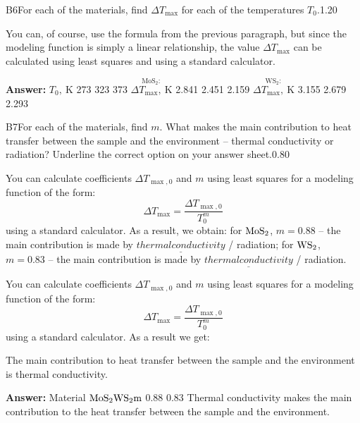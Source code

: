 \documentclass[11pt,a4paper]{article}
\begin{document}
\begin{solcard}{B6}{For each of the materials, find $\Delta T_{\max}$ for each of the temperatures $T_0$.}{1.20}

You can, of course, use the formula from the previous paragraph, but since the modeling function is simply a linear relationship, the value $\Delta T_{\max}$ can be calculated using least squares and using a standard calculator.

\par\smallskip\noindent\textbf{Answer:} $T_0,~\mathrm{K}$ 273 323 373 $\overset{\mathrm{MoS_2:}}{\Delta T_{\max},~\mathrm{K}}$ 2.841 2.451 2.159 $\overset{\mathrm{WS_2:}}{\Delta T_{\max},~\mathrm{K}}$ 3.155 2.679 2.293
\end{solcard}

\begin{solcard}{B7}{For each of the materials, find $m$. What makes the main contribution to heat transfer between the sample and the environment – thermal conductivity or radiation? Underline the correct option on your answer sheet.}{0.80}

You can calculate coefficients $\Delta T_{\max,0}$ and $m$ using least squares for a modeling function of the form: \[\Delta T_{\max}=\frac{\Delta T_{\max,0}}{T_0^m}\] using a standard calculator. As a result, we obtain: for $\rm MoS_2$, $m=0.88$ – the main contribution is made by $\underline{thermal conductivity}$ / radiation; for $\rm WS_2$, $m=0.83$ – the main contribution is made by $\underline{thermal conductivity}$ / radiation.


You can calculate coefficients $\Delta T_{\max,0}$ and $m$ using least squares for a modeling function of the form: \[\Delta T_{\max}=\frac{\Delta T_{\max,0}}{T_0^m}\] using a standard calculator. As a result we get:


The main contribution to heat transfer between the sample and the environment is thermal conductivity.

\par\smallskip\noindent\textbf{Answer:} Material $\rm MoS_2\rm WS_2m$ 0.88 0.83 Thermal conductivity makes the main contribution to the heat transfer between the sample and the environment.
\end{solcard}
\end{document}

